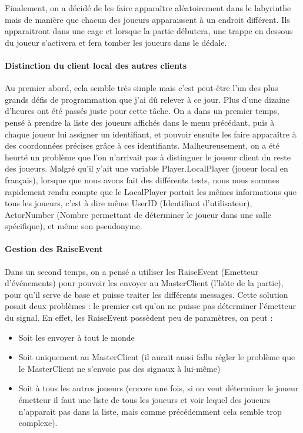 \documentclass{article}
\begin{document}
Finalement, on a décidé de les faire apparaître aléatoirement dans le labyrinthe mais de manière que chacun des joueurs apparaissent à un endroit différent. Ils apparaitront dans une cage et lorsque la partie débutera, une trappe en dessous du joueur s'activera et fera tomber les joueurs dans le dédale.

\paragraph{Distinction du client local des autres clients}

Au premier abord, cela semble très simple mais c'est peut-être l'un des plus grands défis de programmation que j'ai dû relever à ce jour. Plus d'une dizaine d'heures ont été passés juste pour cette tâche.
On a dans un premier temps, pensé à prendre la liste des joueurs affichés dans le menu précédant, puis à chaque joueur lui assigner un identifiant, et pouvoir ensuite les faire apparaître à des coordonnées précises grâce à ces identifiants. Malheureusement, on a été heurté un problème que l’on n’arrivait pas à distinguer le joueur client du reste des joueurs. Malgré qu'il y'ait une variable Player.LocalPlayer (joueur local en français), lorsque que nous avons fait des différents tests, nous nous sommes rapidement rendu compte que le LocalPlayer portait les mêmes informations que tous les joueurs, c'est à dire même UserID (Identifiant d'utilisateur), ActorNumber (Nombre permettant de déterminer le joueur dans une salle spécifique), et même son pseudonyme. 

\newpage
\paragraph{Gestion des RaiseEvent}

Dans un second temps, on a pensé a utiliser les RaiseEvent (Emetteur d'événements) pour pouvoir les envoyer au MasterClient (l'hôte de la partie), pour qu'il serve de base et puisse traiter les différents messages. Cette solution posait deux problèmes : le premier est qu'on ne puisse pas déterminer l'émetteur du signal. En effet, les RaiseEvent possèdent peu de paramètres, on peut :


\begin{itemize}
\item Soit les envoyer à tout le monde
\item Soit uniquement au MasterClient (il aurait aussi fallu régler le problème que le MasterClient ne s'envoie pas des signaux à lui-même)
\item Soit à tous les autres joueurs (encore une fois, si on veut déterminer le joueur émetteur il faut une liste de tous les joueurs et voir lequel des joueurs n'apparait pas dans la liste, mais comme précédemment cela semble trop complexe). 
\end{itemize}
\end{document}
